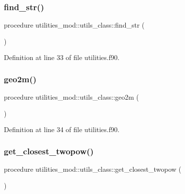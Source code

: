 \subsubsection{\texorpdfstring{find\+\_\+str()}{find\_str()}}
{\footnotesize\ttfamily procedure utilities\+\_\+mod\+::utils\+\_\+class\+::find\+\_\+str (\begin{DoxyParamCaption}{ }\end{DoxyParamCaption})\hspace{0.3cm}{\ttfamily [private]}}



Definition at line 33 of file utilities.\+f90.

\mbox{\label{structutilities__mod_1_1utils__class_a5a63468b29d7fbd5f0549b5ef4cc5577}} 
\subsubsection{\texorpdfstring{geo2m()}{geo2m()}}
{\footnotesize\ttfamily procedure utilities\+\_\+mod\+::utils\+\_\+class\+::geo2m (\begin{DoxyParamCaption}{ }\end{DoxyParamCaption})\hspace{0.3cm}{\ttfamily [private]}}



Definition at line 34 of file utilities.\+f90.

\mbox{\label{structutilities__mod_1_1utils__class_a2fa5e32b744821f0c74e30aeb99e1e2b}} 
\subsubsection{\texorpdfstring{get\+\_\+closest\+\_\+twopow()}{get\_closest\_twopow()}}
{\footnotesize\ttfamily procedure utilities\+\_\+mod\+::utils\+\_\+class\+::get\+\_\+closest\+\_\+twopow (\begin{DoxyParamCaption}{ }\end{DoxyParamCaption})\hspace{0.3cm}{\ttfamily [private]}}



